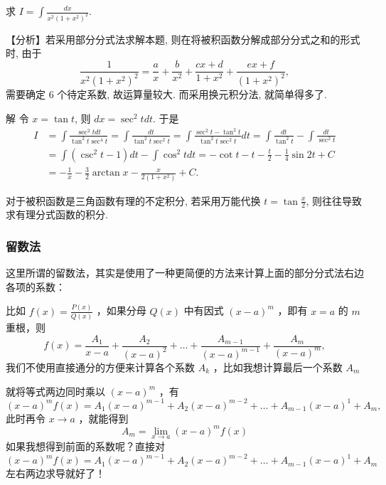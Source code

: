\documentclass[lang=cn,newtx,10pt,scheme=chinese]{elegantbook}
\begin{document}
\begin{example}
  求 $I = \int \frac{dx}{x^2(1 + x^2)^2}$.
\end{example}
\begin{solution}
  【分析】若采用部分分式法求解本题, 则在将被积函数分解成部分分式之和的形式时, 由于
  $$
  \frac{1}{x^2(1 + x^2)^2} = \frac{a}{x} + \frac{b}{x^2} + \frac{cx + d}{1 + x^2} + \frac{ex + f}{(1 + x^2)^2},
  $$
  需要确定 6 个待定系数, 故运算量较大. 而采用换元积分法, 就简单得多了.

  解 令 $x = \tan t$, 则 $dx = \sec^2 t dt$. 于是
  $$
  \begin{aligned}
  I &= \int \frac{\sec^2 t dt}{\tan^2 t \sec^4 t} = \int \frac{dt}{\tan^2 t \sec^2 t} = \int \frac{\sec^2 t - \tan^2 t}{\tan^2 t \sec^2 t} dt = \int \frac{dt}{\tan^2 t} - \int \frac{dt}{\sec^2 t} \\
  &= \int (\csc^2 t - 1) dt - \int \cos^2 t dt = -\cot t - t - \frac{t}{2} - \frac{1}{4} \sin 2t + C \\
  &= -\frac{1}{x} - \frac{3}{2} \arctan x - \frac{x}{2(1 + x^2)} + C.
  \end{aligned}
  $$
\end{solution}

对于被积函数是三角函数有理的不定积分, 若采用万能代换 $t = \tan \frac{x}{2}$, 则往往导致求有理分式函数的积分.


    \subsubsection{留数法}

    这里所谓的留数法，其实是使用了一种更简便的方法来计算上面的部分分式法右边各项的系数：

    比如 $f(x)=\frac{P(x)}{Q(x)}$ ，如果分母 $Q(x)$ 中有因式 $(x - a)^m$ ，即有 $x=a$ 的 $m$ 重根，则
    \begin{equation}
      f(x)=\frac{A_1}{x - a} + \frac{A_2}{(x - a)^2} + \dots + \frac{A_{m-1}}{(x - a)^{m-1}} + \frac{A_m}{(x - a)^m},
    \end{equation}
我们不使用直接通分的方便来计算各个系数 $A_{k}$
，比如我想计算最后一个系数 $A_m$
 

就将等式两边同时乘以 $(x-a)^{m}$ ，有
\begin{equation}
      (x-a)^{m}f(x)=A_1 (x - a)^{m-1} + A_2 (x - a)^{m-2} + \dots + A_{m-1} (x - a)^{1} + A_m,
    \end{equation}
    此时再令 $x\to a$ ，就能得到
    \begin{equation}
      A_m=\lim_{x \to a} (x-a)^{m}f(x)
    \end{equation}
    如果我想得到前面的系数呢？直接对 $(x-a)^{m}f(x)=A_1 (x - a)^{m-1} + A_2 (x - a)^{m-2} + \dots + A_{m-1} (x - a)^{1} + A_m$ 左右两边求导就好了！
\end{document}
